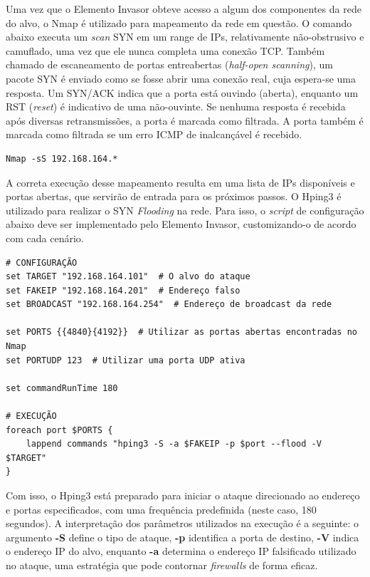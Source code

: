     Uma vez que o Elemento Invasor obteve acesso a algum dos componentes da rede do alvo, o Nmap é utilizado para mapeamento da rede em questão. O comando abaixo executa um \textit{scan} SYN em um range de IPs, relativamente não-obstrusivo e camuflado, uma vez que ele nunca completa uma conexão TCP. Também chamado de escaneamento de portas entreabertas (\textit{half-open scanning}), um pacote SYN é enviado como se fosse abrir uma conexão real, cuja espera-se uma resposta. Um SYN/ACK indica que a porta está ouvindo (aberta), enquanto um RST (\textit{reset}) é indicativo de uma não-ouvinte. Se nenhuma resposta é recebida após diversas retransmissões, a porta é marcada como filtrada. A porta também é marcada como filtrada se um erro ICMP de inalcançável é recebido.

    \begin{verbatim}
Nmap -sS 192.168.164.*
    \end{verbatim}

    A correta execução desse mapeamento resulta em uma lista de IPs disponíveis e portas abertas, que servirão de entrada para os próximos passos. O Hping3 é utilizado para realizar o SYN \textit{Flooding} na rede. Para isso, o \textit{script} de configuração abaixo deve ser implementado pelo Elemento Invasor, customizando-o de acordo com cada cenário.

    \begin{verbatim}
# CONFIGURAÇÃO
set TARGET "192.168.164.101"  # O alvo do ataque
set FAKEIP "192.168.164.201"  # Endereço falso
set BROADCAST "192.168.164.254"  # Endereço de broadcast da rede

set PORTS {{4840}{4192}}  # Utilizar as portas abertas encontradas no Nmap
set PORTUDP 123  # Utilizar uma porta UDP ativa

set commandRunTime 180

# EXECUÇÃO
foreach port $PORTS {
    lappend commands "hping3 -S -a $FAKEIP -p $port --flood -V $TARGET"
}
    \end{verbatim}

    Com isso, o Hping3 está preparado para iniciar o ataque direcionado ao endereço e portas especificados, com uma frequência predefinida (neste caso, 180 segundos). A interpretação dos parâmetros utilizados na execução é a seguinte: o argumento \textbf{-S} define o tipo de ataque, \textbf{-p} identifica a porta de destino, \textbf{-V} indica o endereço IP do alvo, enquanto \textbf{-a} determina o endereço IP falsificado utilizado no ataque, uma estratégia que pode contornar \textit{firewalls} de forma eficaz.

